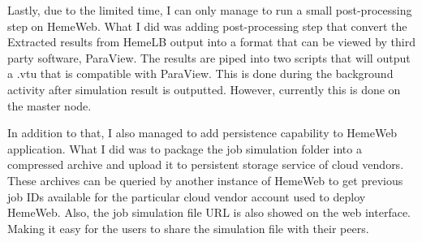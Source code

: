 Lastly, due to the limited time, I can only manage to run a small post-processing step on HemeWeb. What I did was adding post-processing step that convert the Extracted results from HemeLB output into a format that can be viewed by third party software, ParaView. The results are piped into two scripts that will output a .vtu that is compatible with ParaView. This is done during the background activity after simulation result is outputted. However, currently this is done on the master node.

In addition to that, I also managed to add persistence capability to HemeWeb application. What I did was to package the job simulation folder into a compressed archive and upload it to persistent storage service of cloud vendors. These archives can be queried by another instance of HemeWeb to get previous job IDs available for the particular cloud vendor account used to deploy HemeWeb.  Also, the job simulation file URL is also showed on the web interface. Making it easy for the users to share the simulation file with their peers.




